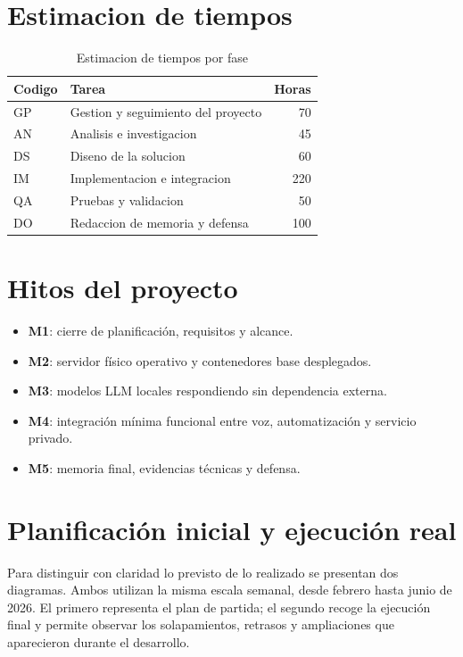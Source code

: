 \section{Estimacion de tiempos}
\begin{table}[H]
  \centering
  \caption{Estimacion de tiempos por fase}
  \label{tab:estimacion-tiempos}
  \begin{tabularx}{\textwidth}{lXr}
    \toprule
    Codigo & Tarea & Horas \\
    \midrule
    GP & Gestion y seguimiento del proyecto & 70 \\
    AN & Analisis e investigacion & 45 \\
    DS & Diseno de la solucion & 60 \\
    IM & Implementacion e integracion & 220 \\
    QA & Pruebas y validacion & 50 \\
    DO & Redaccion de memoria y defensa & 100 \\
    \bottomrule
  \end{tabularx}
\end{table}

\section{Hitos del proyecto}
\begin{itemize}
  \item \textbf{M1}: cierre de planificación, requisitos y alcance.
  \item \textbf{M2}: servidor físico operativo y contenedores base desplegados.
  \item \textbf{M3}: modelos LLM locales respondiendo sin dependencia externa.
  \item \textbf{M4}: integración mínima funcional entre voz, automatización y servicio privado.
  \item \textbf{M5}: memoria final, evidencias técnicas y defensa.
\end{itemize}

\section{Planificación inicial y ejecución real}
Para distinguir con claridad lo previsto de lo realizado se presentan dos diagramas. Ambos utilizan la misma escala semanal, desde febrero hasta junio de 2026. El primero representa el plan de partida; el segundo recoge la ejecución final y permite observar los solapamientos, retrasos y ampliaciones que aparecieron durante el desarrollo.

